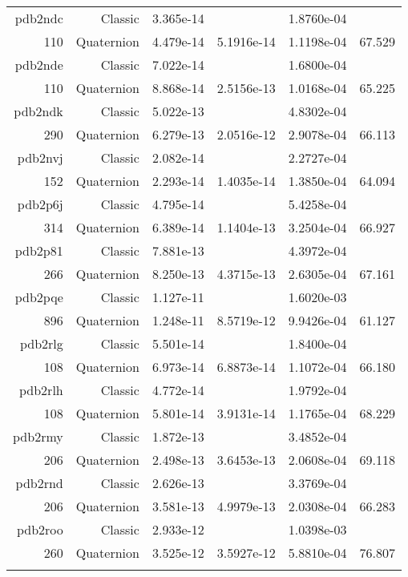 \begin{xltabular}{\textwidth}{r|rS[table-format=1.3e+2]S[table-format=1.4e+2]S[table-format=1.4e+2]S[table-format=-1.3]}
pdb2ndc & Classic & 3.365e-14 &  & 1.8760e-04 & \\
110 & Quaternion & 4.479e-14 & 5.1916e-14 & 1.1198e-04 & 67.529\\  \addlinespace
pdb2nde & Classic & 7.022e-14 &  & 1.6800e-04 & \\
110 & Quaternion & 8.868e-14 & 2.5156e-13 & 1.0168e-04 & 65.225\\  \addlinespace
pdb2ndk & Classic & 5.022e-13 &  & 4.8302e-04 & \\
290 & Quaternion & 6.279e-13 & 2.0516e-12 & 2.9078e-04 & 66.113\\  \addlinespace
pdb2nvj & Classic & 2.082e-14 &  & 2.2727e-04 & \\
152 & Quaternion & 2.293e-14 & 1.4035e-14 & 1.3850e-04 & 64.094\\  \addlinespace
pdb2p6j & Classic & 4.795e-14 &  & 5.4258e-04 & \\
314 & Quaternion & 6.389e-14 & 1.1404e-13 & 3.2504e-04 & 66.927\\  \addlinespace
pdb2p81 & Classic & 7.881e-13 &  & 4.3972e-04 & \\
266 & Quaternion & 8.250e-13 & 4.3715e-13 & 2.6305e-04 & 67.161\\  \addlinespace
pdb2pqe & Classic & 1.127e-11 &  & 1.6020e-03 & \\
896 & Quaternion & 1.248e-11 & 8.5719e-12 & 9.9426e-04 & 61.127\\  \addlinespace
pdb2rlg & Classic & 5.501e-14 &  & 1.8400e-04 & \\
108 & Quaternion & 6.973e-14 & 6.8873e-14 & 1.1072e-04 & 66.180\\  \addlinespace
pdb2rlh & Classic & 4.772e-14 &  & 1.9792e-04 & \\
108 & Quaternion & 5.801e-14 & 3.9131e-14 & 1.1765e-04 & 68.229\\  \addlinespace
pdb2rmy & Classic & 1.872e-13 &  & 3.4852e-04 & \\
206 & Quaternion & 2.498e-13 & 3.6453e-13 & 2.0608e-04 & 69.118\\  \addlinespace
pdb2rnd & Classic & 2.626e-13 &  & 3.3769e-04 & \\
206 & Quaternion & 3.581e-13 & 4.9979e-13 & 2.0308e-04 & 66.283\\  \addlinespace
pdb2roo & Classic & 2.933e-12 &  & 1.0398e-03 & \\
260 & Quaternion & 3.525e-12 & 3.5927e-12 & 5.8810e-04 & 76.807\\  \addlinespace

\end{xltabular}
